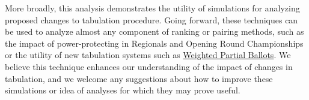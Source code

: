 \documentclass{tufte-handout}
\begin{document}
More broadly, this analysis demonstrates the utility of simulations for analyzing proposed changes to tabulation procedure. Going forward, these techniques can be used to analyze almost any component of ranking or pairing methods, such as the impact of power-protecting in Regionals and Opening Round Championships or the utility of new tabulation systems such as \href{http://anniejw.com/WPB/}{Weighted Partial Ballots}. We believe this technique enhances our understanding of the impact of changes in tabulation, and we welcome any suggestions about how to improve these simulations or idea of analyses for which they may prove useful.
\end{document}
